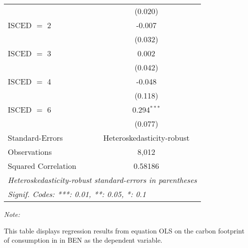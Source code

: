 \begin{table}[htbp!]
\begin{adjustbox}{width = 1\textwidth, max height = 0.95\textheight, center}
\begin{threeparttable}[b]
\begin{tabular}{lc}
                                & (0.020)\\   
            ISCED $=$ 2         & -0.007\\   
                                & (0.032)\\   
            ISCED $=$ 3         & 0.002\\   
                                & (0.042)\\   
            ISCED $=$ 4         & -0.048\\   
                                & (0.118)\\   
            ISCED $=$ 6         & 0.294$^{***}$\\   
                                & (0.077)\\   
            \midrule 
            Standard-Errors     & Heteroskedasticity-robust \\   
            Observations        & 8,012\\  
            Squared Correlation & 0.58186\\  
            \midrule \midrule
            \multicolumn{2}{l}{\emph{Heteroskedasticity-robust standard-errors in parentheses}}\\
            \multicolumn{2}{l}{\emph{Signif. Codes: ***: 0.01, **: 0.05, *: 0.1}}\\
         \end{tabular}
         
         \begin{tablenotes}\item \medskip \textit{Note:}
            \item This table displays regression results from equation OLS on the carbon footprint of consumption in  in BEN as the dependent variable.  
         \end{tablenotes}
      \end{threeparttable}
   \end{adjustbox}
\end{table}


